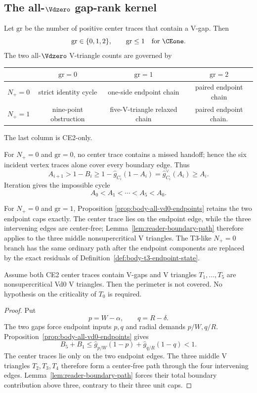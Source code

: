 \subsection{The all-\(\Vdzero\) gap-rank kernel}

Let $\mathrm{gr}$ be the number of positive center traces that contain a
V-gap.  Then
\[
 \mathrm{gr}\in\{0,1,2\},
 \qquad
 \mathrm{gr}\le1\quad\text{for }\CEone.
\]
The two all-$\Vdzero$ V-triangle counts are governed by
\begin{center}
\scriptsize
\begin{tabular}{c|ccc}
 &$\mathrm{gr}=0$&$\mathrm{gr}=1$&$\mathrm{gr}=2$\\ \hline
$N_+=0$&
strict identity cycle&
one-side endpoint chain&
paired endpoint chain\\
$N_+=1$&
nine-point obstruction&
five-V-triangle relaxed chain&
paired endpoint chain.
\end{tabular}
\end{center}
The last column is CE2-only.

For $N_+=0$ and $\mathrm{gr}=0$, no center trace contains a missed handoff;
hence the six incident vertex traces alone cover every boundary edge.  Thus
\[
 A_{i+1}>1-B_i
 \ge1-\widehat g_{C_i}(1-A_i)
 =\widehat g_{C_i}^\vee(A_i)
 \ge A_i.
\]
Iteration gives the impossible cycle
\[
 A_0<A_1<\cdots<A_5<A_0.
\]

For $N_+=0$ and $\mathrm{gr}=1$, Proposition
\ref{prop:body-all-vd0-endpoints} retains the two endpoint caps exactly.  The
center trace lies on the endpoint edge, while the three intervening edges are
center-free; Lemma~\ref{lem:reader-boundary-path} therefore applies to the
three middle nonsupercritical V triangles.  The T3-like $N_+=0$ branch has the same
ordinary path after the endpoint components are replaced by the exact
residuals of Definition~\ref{def:body-t3-endpoint-state}.

\begin{proposition}
\label{prop:reader-common-two-gap}
Assume both CE2 center traces contain V-gaps and V triangles $T_1,\ldots,T_5$ are
nonsupercritical Vd0 V triangles.  Then the perimeter is not covered.  No hypothesis
on the criticality of $T_0$ is required.
\end{proposition}

\begin{proof}
Put
\[
 p=W-\alpha,\qquad q=R-\delta.
\]
The two gaps force endpoint inputs $p,q$ and radial demands $p/W,q/R$.
Proposition~\ref{prop:body-all-vd0-endpoints} gives
\[
 B_5+B_1
 \le\widehat g_{p/W}(1-p)+\widehat g_{q/R}(1-q)<1.
\]
The center traces lie only on the two endpoint edges.  The three middle V triangles
$T_2,T_3,T_4$ therefore form a center-free path through the four intervening
edges.  Lemma~\ref{lem:reader-boundary-path} forces their total boundary
contribution above three, contrary to their three unit caps.
\end{proof}

